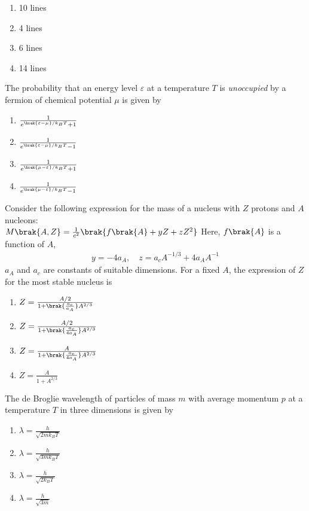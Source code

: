     \begin{enumerate}
        \item 10 lines
        \item 4 lines
        \item 6 lines
        \item 14 lines
    \end{enumerate}
    \item The probability that an energy level $\varepsilon$ at a temperature $T$ is \textit{unoccupied} by a fermion of chemical potential $\mu$ is given by
    \begin{enumerate}
        \item $\frac{1}{e^{\brak{\varepsilon - \mu} / k_B T} + 1}$
        \item $\frac{1}{e^{\brak{\varepsilon - \mu} / k_B T} - 1}$
        \item $\frac{1}{e^{\brak{\mu - \varepsilon} / k_B T} + 1}$
        \item $\frac{1}{e^{\brak{\mu - \varepsilon} / k_B T} - 1}$
    \end{enumerate}
    \item Consider the following expression for the mass of a nucleus with $Z$ protons and $A$ nucleons:\\
    $
    M\brak{A, Z} = \frac{1}{c^2} \brak{f\brak{A} + yZ + zZ^2}
    $
    Here, $f\brak{A}$ is a function of $A$,
    \begin{align*}
    y = -4a_A, \quad z = a_c A^{-1/3} + 4a_A A^{-1}
    \end{align*}
    $a_A$ and $a_c$ are constants of suitable dimensions. For a fixed $A$, the expression of $Z$ for the most stable nucleus is
    \begin{enumerate}
        \item $Z = \frac{A / 2}{1 + \brak{\frac{a_c}{a_A}} A^{2/3}}$
        \item $Z = \frac{A / 2}{1 + \brak{\frac{a_c}{4a_A}} A^{2/3}}$
        \item $Z = \frac{A}{1 + \brak{\frac{a_c}{4a_A}} A^{2/3}}$
        \item $Z = \frac{A}{1 + A^{2/3}}$
    \end{enumerate}
    \item The de Broglie wavelength of particles of mass $m$ with average momentum $p$ at a temperature $T$ in three dimensions is given by
    \begin{enumerate}
        \item $\lambda = \frac{h}{\sqrt{2mk_B T}}$
        \item $\lambda = \frac{h}{\sqrt{3mk_B T}}$
        \item $\lambda = \frac{h}{\sqrt{2k_B T}}$
        \item $\lambda = \frac{h}{\sqrt{3m}}$
    \end{enumerate}

